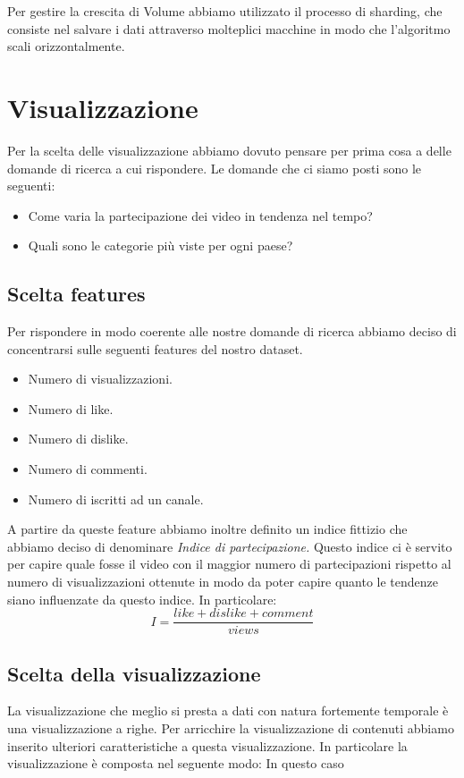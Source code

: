 \documentclass[10pt, a4paper,openany]{article}
\begin{document}
Per gestire la crescita di Volume abbiamo utilizzato il processo di sharding, che consiste nel salvare i dati attraverso molteplici macchine in modo che l'algoritmo scali orizzontalmente.
\section*{Visualizzazione}
Per la scelta delle visualizzazione abbiamo dovuto pensare per prima cosa a delle domande di ricerca a cui rispondere. Le domande che ci siamo posti sono le seguenti:
\begin{itemize}
	\item Come varia la partecipazione dei video in tendenza nel tempo?
	\item Quali sono le categorie più viste per ogni paese?
\end{itemize}

\subsection*{Scelta features}
Per rispondere in modo coerente alle nostre domande di ricerca abbiamo deciso di concentrarsi sulle seguenti features del nostro dataset.
\begin{itemize}
	\item Numero di visualizzazioni.
	\item Numero di like.
	\item Numero di dislike.
	\item Numero di commenti.
	\item Numero di iscritti ad un canale.
\end{itemize}

A partire da queste feature abbiamo inoltre definito un indice fittizio che abbiamo deciso di denominare \textit{Indice di partecipazione.} Questo indice ci è servito per capire quale fosse il video con il maggior numero di partecipazioni rispetto al numero di visualizzazioni ottenute in modo da poter capire quanto le tendenze siano influenzate da questo indice. In particolare:
\[ I = \frac{like+dislike+comment}{views}\]
\subsection*{Scelta della visualizzazione}
La visualizzazione che meglio si presta a dati con natura fortemente temporale è una visualizzazione a righe. Per arricchire la visualizzazione di contenuti abbiamo inserito ulteriori caratteristiche a questa visualizzazione. In particolare la visualizzazione è composta nel seguente modo:
In questo caso 
\end{document}
